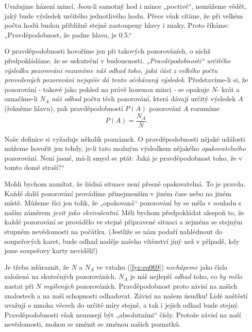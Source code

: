     Uvažujme házení mincí. Jsou-li samotný hod i mince „poctivé“, nemůžeme vědět, jaký bude 
    výsledek určitého jednotlivého hodu. Přece však cítíme, že při velkém počtu hodů budou 
    přibližně stejně zastoupeny hlavy i znaky. Proto říkáme: „Pravděpodobnost, že padne hlava, je 
    \num{0.5}.“
    
    O pravděpodobnosti hovoříme jen při takových pozorováních, o nichž předpokládáme, že se 
    uskuteční v budoucnosti. \emph{„Pravděpodobnosti“ určitého výsledku pozorováni rozumíme náš 
    odhad toho, jaká část z velkého počtu provedených pozorováni nejspíše dá tento očekávaný 
    výsledek}. Představíme-li si, že pozorování - takové jako pohled na právě hozenou minci - se 
    opakuje \(N\)- krát a označíme-li \(N_A\) \emph{náš odhad} počtu těch pozorování, která dávají 
    určitý výsledek \(A\) (řekněme hlavu), pak pravděpodobností \(P (A)\) pozorování \(A\) rozumíme
    \begin{equation}\label{fyz:eq069}
      P(A) = \frac{N_A}{N}.
    \end{equation}
    
    Naše definice si vyžaduje několik poznámek. O pravděpodobnosti nějaké události můžeme hovořit 
    jen tehdy, je-li tato možným výsledkem nějakého \emph{opakovatelného} pozorování. Není jasné, 
    má-li smysl se ptát: Jaká je pravděpodobnost toho, že v tomto domě straší?“
    
    Mohli bychom namítat, že žádná situace není přesně opakovatelná. To je pravda. Každé další 
    pozorování provádíme přinejmenším v jiném čase nebo na jiném místě. Můžeme říci jen tolik, že 
    „opakovaná“ pozorování by se měla v souladu s naším záměrem \emph{jevit jako ekvivalentní}. 
    Měli bychom předpokládat alespoň to, že každé pozorování se provádělo ve stejně připravené 
    situaci a zejména se stejným stupněm nevědomosti na počátku. (Jestliže se nám podaří nahlédnout 
    do soupeřových karet, bude odhad naděje našeho vítězství jiný než v případě, kdy jsme soupeřovy 
    karty neviděli!)
    
    Je třeba zdůraznit, že \(N\) a \(N_A\) ve vztahu (\ref{fyz:eq069}) \emph{nechápeme} jako čísla 
    založená na skutečných pozorováních. \(N_A\) je náš nejlepší \emph{odhad} toho, co \emph{by 
    mělo} nastat při \(N\) \emph{myšlených} pozorováních. Pravděpodobnost proto závisí na našich 
    znalostech a na naší schopnosti odhadovat. Závisí na našem úsudku! Lidé naštěstí uvažují o 
    mnoha věcech do určité míry stejně, a tak i jejich odhad bude stejný. Pravděpodobnosti však 
    nemusejí být „absolutními“ čísly. Protože závisí na naší nevědomosti, mohou se změnit se změnou 
    našich poznatků.
    
